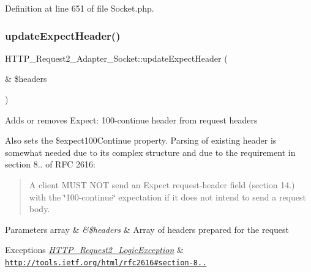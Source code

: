 Definition at line 651 of file Socket.\+php.

\mbox{\label{classHTTP__Request2__Adapter__Socket_a7a547941e41ce97677f3217284a0c447}} 
\subsubsection{\texorpdfstring{update\+Expect\+Header()}{updateExpectHeader()}}
{\footnotesize\ttfamily H\+T\+T\+P\+\_\+\+Request2\+\_\+\+Adapter\+\_\+\+Socket\+::update\+Expect\+Header (\begin{DoxyParamCaption}\item[{\&}]{\$headers }\end{DoxyParamCaption})\hspace{0.3cm}{\ttfamily [protected]}}

Adds or removes \textquotesingle{}Expect\+: 100-\/continue\textquotesingle{} header from request headers

Also sets the \$expect100\+Continue property. Parsing of existing header is somewhat needed due to its complex structure and due to the requirement in section 8.. of R\+FC 2616\+: \begin{quote}
A client M\+U\+ST N\+OT send an Expect request-\/header field (section 14.) with the \char`\"{}100-\/continue\char`\"{} expectation if it does not intend to send a request body. \end{quote}



\begin{DoxyParams}[1]{Parameters}
array & {\em \&\$headers} & Array of headers prepared for the request\\
\hline
\end{DoxyParams}

\begin{DoxyExceptions}{Exceptions}
{\em \hyperlink{classHTTP__Request2__LogicException}{H\+T\+T\+P\+\_\+\+Request2\+\_\+\+Logic\+Exception}} & \hyperlink{}{\href{http://tools.ietf.org/html/rfc2616#section-8.2.3}{\tt http\+://tools.\+ietf.\+org/html/rfc2616\#section-\/8..} }\\
\hline
\end{DoxyExceptions}


